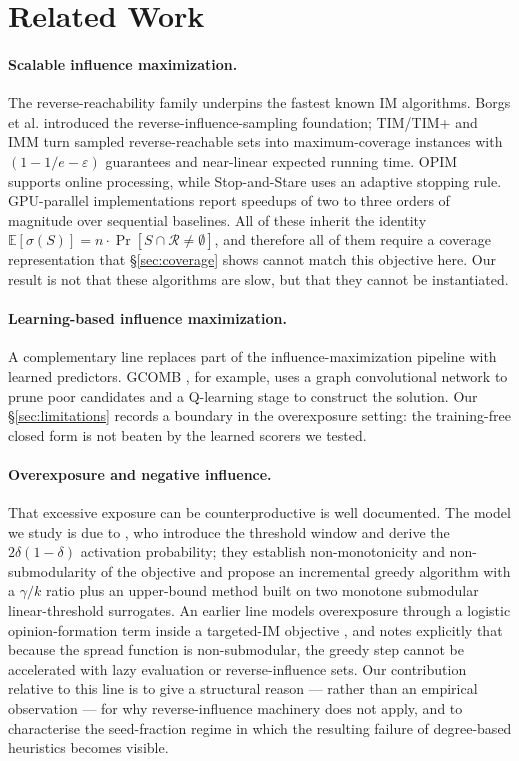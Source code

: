 \section{Related Work}
\label{sec:related}

\paragraph{Scalable influence maximization.}
The reverse-reachability family underpins the fastest known IM algorithms. Borgs et al.
\cite{borgs2014tim} introduced the reverse-influence-sampling foundation; TIM/TIM+
\cite{tang2014timplus} and IMM \cite{tang2015imm} turn sampled reverse-reachable sets into
maximum-coverage instances with $(1-1/e-\varepsilon)$ guarantees and near-linear expected running
time. OPIM \cite{tang2018online} supports online processing, while Stop-and-Stare
\cite{nguyen2016stop} uses an adaptive stopping rule. GPU-parallel implementations
\cite{shahrouz2021gim,min2020curipples} report speedups of two to three orders of magnitude over
sequential baselines. All of these inherit the identity
$\mathbb{E}[\sigma(S)] = n \cdot \Pr[S \cap \mathcal{R} \neq \emptyset]$, and therefore all of
them require a coverage representation that \S\ref{sec:coverage} shows cannot match this objective
here. Our result is not that these algorithms are slow, but that they cannot be instantiated.

\paragraph{Learning-based influence maximization.}
A complementary line replaces part of the influence-maximization pipeline with learned predictors.
GCOMB \cite{manchanda2020gcomb}, for example, uses a graph convolutional network to prune poor
candidates and a Q-learning stage to construct the solution. Our \S\ref{sec:limitations} records
a boundary in the overexposure setting: the training-free closed form is not beaten by the learned
scorers we tested.

\paragraph{Overexposure and negative influence.}
That excessive exposure can be counterproductive is well documented. The model we study is due to
\cite{zhu2026overexposure}, who introduce the threshold window and derive the
$2\delta(1-\delta)$ activation probability; they establish non-monotonicity and non-submodularity
of the objective and propose an incremental greedy algorithm with a $\gamma/k$ ratio plus an
upper-bound method built on two monotone submodular linear-threshold surrogates. An earlier line
models overexposure through a logistic opinion-formation term inside a targeted-IM objective
\cite{loukides2020laico}, and notes explicitly that because the spread function is
non-submodular, the greedy step cannot be accelerated with lazy evaluation or reverse-influence
sets. Our contribution relative to this line is to give a structural reason --- rather than an
empirical observation --- for why reverse-influence machinery does not apply, and to characterise
the seed-fraction regime in which the resulting failure of degree-based heuristics becomes
visible.

